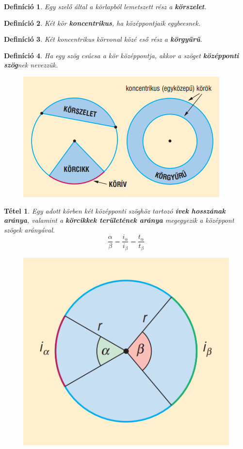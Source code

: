 \documentclass[12pt,a4paper]{article}
\newtheorem{theorem}{Tétel} [section]
\newtheorem{definition}{Definíció} [section]
\begin{document}
\begin{definition}
Egy szelő által a körlapból lemetszett rész a \textbf{körszelet}.
\end{definition}

\begin{definition}
Két kör \textbf{koncentrikus}, ha középpontjaik egybeesnek.
\end{definition}

\begin{definition}
Két koncentrikus körvonal közé eső rész a \textbf{körgyűrű}.
\end{definition}

\begin{definition}
Ha egy szög csúcsa a kör középpontja, akkor a szöget \textbf{középponti szög}nek nevezzük.
\end{definition}
\begin{figure}[h]
\centering
\includegraphics[scale=0.4]{geometry/korgyuru}
\end{figure}
\newpage

\begin{theorem}
Egy adott körben két középponti szöghöz tartozó \textbf{ívek hosszának aránya}, valamint a \textbf{körcikkek területének aránya} megegyezik a középpont szögek arányával.
$$\dfrac{\alpha}{\beta}=\dfrac{i_\alpha}{i_\beta}=\dfrac{t_\alpha}{t_\beta}$$
\begin{figure}[h]
\centering
\includegraphics[scale=0.3]{geometry/korcikk}
\end{figure}
\end{theorem}
\end{document}
